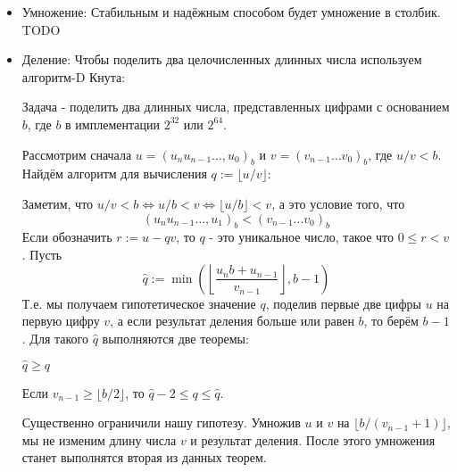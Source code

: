\begin{itemize}
\begin{cppcode}
{    ++*this;
}
  \end{cppcode}
  Значит отрицанием будет:
  \begin{cppcode}
constexpr uint_t operator-() const {
    uint_t result = *this;
    result.negative();
    return result;
}
  \end{cppcode}
  Определяем внешние friend для вычитания:
  \begin{cppcode}
friend constexpr uint_t operator-(const uint_t& lhs, const uint_t& rhs) {
    uint_t result = lhs;
    result -= rhs;
    return result;
}

friend constexpr uint_t operator-(uint_t&& lhs, const uint_t& rhs) {
    lhs -= rhs;
    return lhs;
}

friend constexpr uint_t operator-(const uint_t& lhs, uint_t&& rhs) {
    rhs -= lhs;
    rhs.negative();
    return rhs;
}

friend constexpr uint_t operator-(uint_t&& lhs, uint_t&& rhs) {
    lhs -= rhs;
    return lhs;
}
  \end{cppcode}
  \item Умножение:
    Стабильным и надёжным способом будет умножение в столбик. TODO
  \item Деление:
    Чтобы поделить два целочисленных длинных числа используем алгоритм-D Кнута:

    Задача - поделить два длинных числа, представленных цифрами с основанием $b$, где $b$ в имплементации $2^{32}$ или $2^{64}$. 

   Рассмотрим сначала $u=(u_nu_{n-1}\dots,u_0)_b$ и $v=(v_{n-1}\dots v_0)_b$, где $u/v <b$. Найдём алгоритм для вычисления $q:=\lfloor u/v \rfloor$:

   Заметим, что $u/v<b\Leftrightarrow u/b < v\Leftrightarrow \lfloor u/b\rfloor < v$, а это условие того, что \[(u_nu_{n-1}\dots,u_1)_b <  (v_{n-1}\dots v_0)_b\]
   Если обозначить $r:=u - qv$, то $q$ - это уникальное число, такое что $0\leqslant r <v$. Пусть
   \[\hat{q}:=\min \left(\left\lfloor \frac{u_nb + u_{n-1}}{v_{n-1}}\right\rfloor, b-1\right)\]
   Т.е. мы получаем гипотетическое значение $q$, поделив первые две цифры $u$ на первую цифру $v$, а если результат деления больше или равен $b$, то берём $b-1$. Для такого $\hat{q}$ выполняются две теоремы: 
   \begin{theorem}
    $\hat{q}\geqslant q$
   \end{theorem}
   \begin{theorem}
     Если $v_{n-1}\geqslant \lfloor b/2\rfloor$, то $\hat{q}-2\leqslant q\leqslant \hat{q}$.
   \end{theorem}
   Существенно ограничили нашу гипотезу. Умножив $u$ и $v$ на $\lfloor b/(v_{n-1}+1)\rfloor$, мы не изменим длину числа $v$ и результат деления. После этого умножения станет выполнятся вторая из данных теорем.


\end{itemize}
